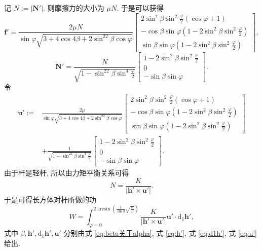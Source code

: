 \documentclass{article}
\begin{document}
记 $N:=\left|\mathbf N'\right|$.
则摩擦力的大小为 $\mu N$.
于是可以获得
\begin{equation}
	\mathbf f'=\frac{2\mu N}{\sin\varphi\sqrt{3+4\cos4\beta+2\sin^22\beta\cos\varphi}}
	\left[\begin{matrix}
		2\sin^2\beta\sin^2\frac\varphi2\left(\cos\varphi+1\right)\\
		-\cos\beta\sin\varphi\left(1-2\sin^2\beta\sin^2\frac\varphi2\right)\\
		\sin\beta\sin\varphi\left(1-2\sin^2\beta\sin^2\frac\varphi2\right)
	\end{matrix}\right],
\end{equation}
\begin{equation}
	\mathbf N'=\frac N{\sqrt{1-\sin^22\beta\sin^4\frac\varphi2}}\left[\begin{matrix}
	1-2\sin^2\beta\sin^2\frac\varphi2\\0\\-\sin\beta\sin\varphi\end{matrix}\right].
\end{equation}
令
\begin{equation}\begin{split}
	\label{eq:u'}
	\mathbf u':=&\frac{2\mu}{\sin\varphi\sqrt{3+4\cos4\beta+2\sin^22\beta\cos\varphi}}
	\left[\begin{matrix}
		2\sin^2\beta\sin^2\frac\varphi2\left(\cos\varphi+1\right)\\
		-\cos\beta\sin\varphi\left(1-2\sin^2\beta\sin^2\frac\varphi2\right)\\
		\sin\beta\sin\varphi\left(1-2\sin^2\beta\sin^2\frac\varphi2\right)
	\end{matrix}\right]
	\\&+
	\frac 1{\sqrt{1-\sin^22\beta\sin^4\frac\varphi2}}\left[\begin{matrix}
	1-2\sin^2\beta\sin^2\frac\varphi2\\0\\-\sin\beta\sin\varphi\end{matrix}\right].
\end{split}\end{equation}
由于杆是轻杆, 所以由力矩平衡关系可得
\begin{equation}
	N=\frac K{\left|\mathbf h'\times\mathbf u'\right|}.
\end{equation}
于是可得长方体对杆所做的功
\begin{equation}
	W=\int_{\varphi=0}^{2\arcsin\left(\frac1{\sin\beta}\sqrt{\frac w{2l}}\right)}
	\frac K{\left|\mathbf h'\times\mathbf u'\right|}\mathbf u'\cdot\mathrm d_1\mathbf h',
\end{equation}
式中 $\beta,\mathbf h',\mathrm d_1\mathbf h',\mathbf u'$ 分别由式 \ref{eq:beta关于alpha},
式 \ref{eq:h'}, 式 \ref{eq:d1h'}, 式 \ref{eq:u'} 给出.
\end{document}

